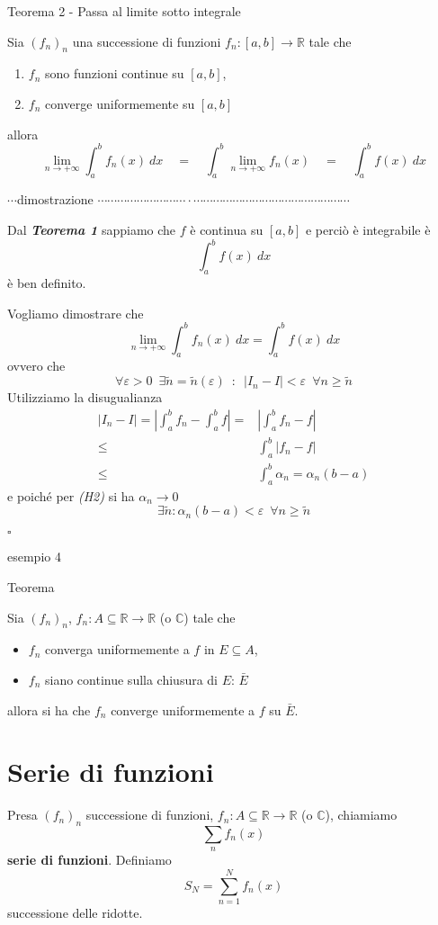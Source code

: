 \documentclass[x11names]{article}
\newcommand*{\QEDB}{\null\nobreak\hfill\ensuremath{\square}}%
\newcommand{\esempio}[2]{
	\begin{es}{esempio #1}
		#2
	\end{es}
}
\newcommand{\teorema}[2]{
	\begin{center}
		\fboxsep11pt
		\colorbox{myred}{\begin{minipage}{5.75in}
				\begin{redes}{#1}
					#2
				\end{redes}
		\end{minipage}}
	\end{center}
}
\newcommand{\dimostrazione}[2]{
	\begin{dym}{\(\cdots\)dimostrazione#1 \(\cdots \cdots \cdots \cdots \cdots \cdots \cdots \cdots \cdots\cdot\cdots\cdots\cdots\cdots\cdots\cdots\cdots\cdots\cdots\cdots\cdots\cdots\cdots\cdots\cdots\cdots\)}
		#2
		\QEDB
	\end{dym}
}
\begin{document}
\teorema{Teorema 2 - Passa al limite sotto integrale}{
Sia \((f_{n})_{n}\) una successione di funzioni \(f_{n}:[a,b]\to \mathbb{R}\) tale che
\begin{enumerate}[start=1,label={(\itshape H\arabic*)}]
	\item \(f_{n}\) sono funzioni continue su \([a,b]\),
	\item \(f_{n}\) converge uniformemente su \([a,b]\)
\end{enumerate}
allora 
\[ 
\lim_{n\to+\infty} \int_{a}^{b}f_{n}(x) \: dx \quad = \quad \int_{a}^{b}\lim_{n\to+\infty} f_{n}(x) \quad = \quad \int_{a}^{b}f(x) \: dx
\]
}
\dimostrazione{}{
Dal \textit{\textbf{Teorema 1}} sappiamo che \(f\) è continua su \([a,b]\) e perciò è integrabile è 
\[ 
\int_{a}^{b}f(x)\: dx
\]
è ben definito.

Vogliamo dimostrare che
\[ 
\lim_{n\to+\infty}\int_{a}^{b}f_{n}(x)\: dx = \int_{a}^{b}f(x)\: dx 
\]
ovvero che 
\[ 
\forall \varepsilon > 0 \;\ \exists\tilde{n} = \tilde{n}(\varepsilon) \;\ : \;\ |I_{n} - I| < \varepsilon \;\ \forall n \geq \tilde{n}
\]
Utilizziamo la disugualianza
\begin{align*}
	|I_{n} - I|  = \left|\int_{a}^{b}f_{n} - \int_{a}^{b}f\right| =& \left|\int_{a}^{b}f_{n} - f\right| \\
    \leq & \int_{a}^{b}|f_{n} - f | \\
	\leq & \int_{a}^{b} \alpha_{n} = \alpha_{n}(b-a)
\end{align*}
e poiché per \textit{(H2)} si ha \(\alpha_{n} \to 0\) 
\[ 
\exists\tilde{n} : \alpha_{n}(b-a) < \varepsilon \;\ \forall n \geq \tilde{n}
\]
}

\esempio{4}{}

\teorema{Teorema}{
Sia \((f_{n})_{n}\), \(f_{n}:A\subseteq \mathbb{R}\to \mathbb{R}\) (o \(\mathbb{C}\)) tale che 
\begin{itemize}
	\item \(f_{n}\) converga uniformemente a \(f\) in \(E \subseteq A\),
	\item \(f_{n}\) siano continue sulla chiusura di \(E\): \(\bar{E}\)
\end{itemize}
allora si ha che \(f_{n}\) converge uniformemente a \(f\) su \(\bar{E}\).
}


\newpage
\section{Serie di funzioni}
Presa \((f_{n})_{n}\) successione di funzioni, \(f_{n}:A\subseteq \mathbb{R} \to \mathbb{R}\) (o \(\mathbb{C}\)), chiamiamo 
\[ 
\sum_n f_{n}(x)
\]
\textbf{serie di funzioni}. Definiamo
\[ 
S_{N} = \sum_{n=1}^N f_{n}(x)
\]
successione delle ridotte.
\end{document}
